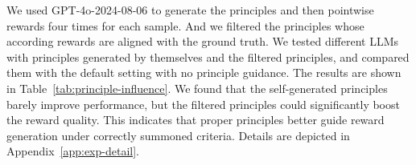 \documentclass{article} %
\newcommand{\SGRM}{DeepSeek-GRM-27B\xspace}
\begin{document}
\begin{table}
  \centering
  \caption{Preliminary experiments on the influence of principles on reward quality. The default setting of \SGRM includes self-generated principles.}
  \label{tab:principle-influence}
\end{table}

We used GPT-4o-2024-08-06 to generate the principles and then pointwise rewards four times for each sample. And we filtered the principles whose according rewards are aligned with the ground truth. We tested different LLMs with principles generated by themselves and the filtered principles, and compared them with the default setting with no principle guidance. The results are shown in Table~\ref{tab:principle-influence}. We found that the self-generated principles barely improve performance, but the filtered principles could significantly boost the reward quality. This indicates that proper principles better guide reward generation under correctly summoned criteria. 
Details are depicted in Appendix~\ref{app:exp-detail}. 
\end{document}
